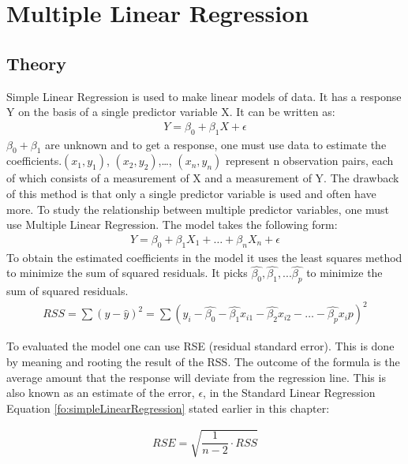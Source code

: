 \section{Multiple Linear Regression}\label{sc:multipleLinearRegression}

\subsection{Theory}
Simple Linear Regression is used to make linear models of data. It has a response Y on the basis of a single predictor variable X. It can be written as:
\begin{align}\label{fo:simpleLinearRegression}
Y = \beta_0 + \beta_1 X + \epsilon
\end{align}
$ \beta_0 + \beta_1 $ are unknown and to get a response, one must use data to estimate the coefficients.$(x_1, y_1)$, $(x_2, y_2)$,\dots, $(x_n, y_n)$ represent n observation pairs, each of which consists of a measurement of X and a measurement of Y. The drawback of this method is that only a single predictor variable is used and often have more. To study the relationship between multiple predictor variables, one must use Multiple Linear Regression. The model takes the following form:
\begin{align}\label{fo:multipleLinearRegression}
Y = \beta_0 + \beta_1 X_1 + \ldots + \beta_n X_n + \epsilon
\end{align}
To obtain the estimated coefficients in the model it uses the least squares method to minimize the sum of squared residuals. It picks $\hat{\beta_0}, \hat{\beta_1}, ... \hat{\beta_p}$ to minimize the sum of squared residuals.
\begin{align}\label{fo:rss}
RSS = \sum (y - \hat{y})^2 = \sum( y_i - \hat{\beta_0} - \hat{\beta_1}x_{i1} - \hat{\beta_2}x_{i2} - \ldots - \hat{\beta_p}x_\textit{i}p )^2
\end{align}

To evaluated the model one can use RSE (residual standard error). This is done by meaning and rooting the result of the RSS. The outcome of the formula is the average amount that the response will deviate from the regression line. This is also known as an estimate of the error, $\epsilon$, in the Standard Linear Regression Equation \ref{fo:simpleLinearRegression} stated earlier in this chapter:

\begin{align}\label{fo:rse}
RSE = \sqrt{\dfrac{1}{n-2}\cdot RSS}
\end{align}


